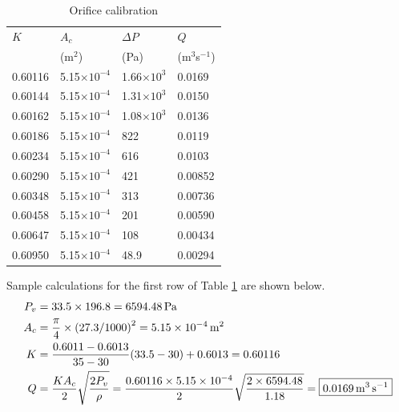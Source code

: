 \begin{table}[h]
    \centering
    \caption{Orifice calibration}
    \label{tab:orifice_calibration}
    \begin{tabular}{p{2cm}p{2cm}p{2cm}p{2cm}}
        \toprule
        $K$ & $A_c$ & $\Delta P$ & $Q$ \\ 
        & (m$^2$) & (Pa) & (m$^3$s$^{-1}$) \\
        \midrule
        0.60116 & 5.15$\times 10^{-4}$ & 1.66$\times 10^3$ & 0.0169 \\
        0.60144 & 5.15$\times 10^{-4}$ & 1.31$\times 10^3$ & 0.0150 \\
        0.60162 & 5.15$\times 10^{-4}$ & 1.08$\times 10^3$ & 0.0136 \\
        0.60186 & 5.15$\times 10^{-4}$ & 822 & 0.0119 \\
        0.60234 & 5.15$\times 10^{-4}$ & 616 & 0.0103 \\
        0.60290 & 5.15$\times 10^{-4}$ & 421 & 0.00852 \\
        0.60348 & 5.15$\times 10^{-4}$ & 313 & 0.00736 \\
        0.60458 & 5.15$\times 10^{-4}$ & 201 & 0.00590 \\
        0.60647 & 5.15$\times 10^{-4}$ & 108 & 0.00434 \\
        0.60950 & 5.15$\times 10^{-4}$ & 48.9 & 0.00294 \\
        \bottomrule
    \end{tabular}
\end{table}

Sample calculations for the first row of Table \ref{tab:orifice_calibration} are shown below.
\begin{align*}
    P_v &= 33.5 \times 196.8 = \qty{6594.48}{\pascal} \\
    A_c &= \frac{\pi}{4} \times \left(27.3/1000\right)^2 = \qty{5.15E-4}{\meter\squared} \\
    K &= \frac{0.6011 - 0.6013}{35-30}(33.5 - 30) + 0.6013 = 0.60116 \\
    Q &= \frac{K A_c}{2} \sqrt{\frac{2 P_v}{\rho}} = \frac{0.60116 \times 5.15 \times 10^{-4}}{2} \sqrt{\frac{2 \times 6594.48}{1.18}} 
    = \boxed{\qty{0.0169}{\meter\cubed\per\second}}
\end{align*}

\section{}

